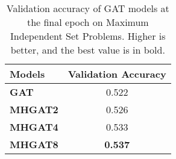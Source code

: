 \begin{table}[htb!]
    \centering
    \begin{tabular}{|l c|}
        \hline
        \textbf{Models} & \textbf{Validation Accuracy}\\
        \hline
        \textbf{GAT} & 0.522\\
        \textbf{MHGAT2} & 0.526\\
        \textbf{MHGAT4} & 0.533\\
        \textbf{MHGAT8} & \textbf{0.537}\\
        \hline
    \end{tabular}
    \caption{Validation accuracy of GAT models at the final epoch on Maximum Independent Set Problems.
    Higher is better, and the best value is in bold.}
    \label{tab:is-validation-accuracy}
\end{table}